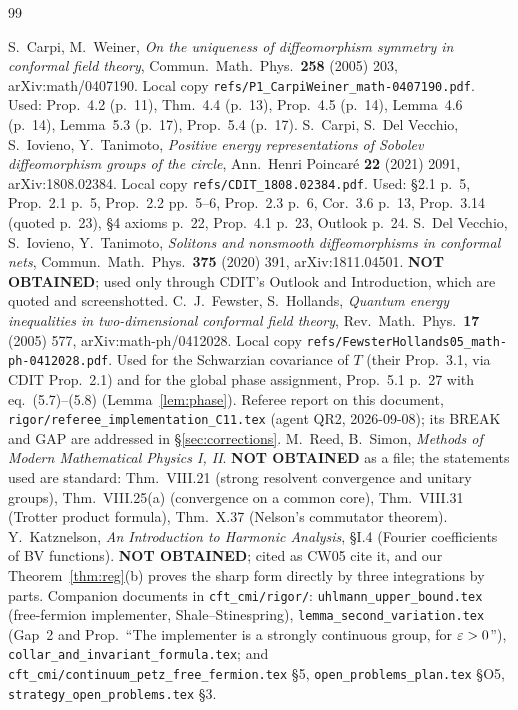 \documentclass[11pt]{article}
\begin{document}
\begin{thebibliography}{99}

 S.~Carpi, M.~Weiner, \emph{On the uniqueness of diffeomorphism symmetry in conformal field theory},
Commun.\ Math.\ Phys.\ \textbf{258} (2005) 203, arXiv:math/0407190.  Local copy
\texttt{refs/P1\_CarpiWeiner\_math-0407190.pdf}.  Used: Prop.~4.2 (p.~11), Thm.~4.4 (p.~13), Prop.~4.5 (p.~14),
Lemma~4.6 (p.~14), Lemma~5.3 (p.~17), Prop.~5.4 (p.~17).
 S.~Carpi, S.~Del Vecchio, S.~Iovieno, Y.~Tanimoto, \emph{Positive energy representations of Sobolev
diffeomorphism groups of the circle}, Ann.\ Henri Poincar\'e \textbf{22} (2021) 2091, arXiv:1808.02384.  Local copy
\texttt{refs/CDIT\_1808.02384.pdf}.  Used: \S2.1 p.~5, Prop.~2.1 p.~5, Prop.~2.2 pp.~5--6, Prop.~2.3 p.~6,
Cor.~3.6 p.~13, Prop.~3.14 (quoted p.~23), \S4 axioms p.~22, Prop.~4.1 p.~23, Outlook p.~24.
 S.~Del Vecchio, S.~Iovieno, Y.~Tanimoto, \emph{Solitons and nonsmooth diffeomorphisms in conformal
nets}, Commun.\ Math.\ Phys.\ \textbf{375} (2020) 391, arXiv:1811.04501.  \textbf{NOT OBTAINED}; used only through
CDIT's Outlook and Introduction, which are quoted and screenshotted.
 C.~J.~Fewster, S.~Hollands, \emph{Quantum energy inequalities in two-dimensional conformal field
theory}, Rev.\ Math.\ Phys.\ \textbf{17} (2005) 577, arXiv:math-ph/0412028.  Local copy
\texttt{refs/FewsterHollands05\_math-ph-0412028.pdf}.  Used for the Schwarzian covariance of $T$ (their Prop.~3.1,
via CDIT Prop.~2.1) and for the global phase assignment, Prop.~5.1 p.~27 with eq.~(5.7)--(5.8) (Lemma~\ref{lem:phase}).
 Referee report on this document, \texttt{rigor/referee\_implementation\_C11.tex} (agent QR2, 2026-09-08);
its BREAK and GAP are addressed in \S\ref{sec:corrections}.
 M.~Reed, B.~Simon, \emph{Methods of Modern Mathematical Physics I, II}.  \textbf{NOT OBTAINED} as a
file; the statements used are standard: Thm.~VIII.21 (strong resolvent convergence and unitary groups),
Thm.~VIII.25(a) (convergence on a common core), Thm.~VIII.31 (Trotter product formula), Thm.~X.37 (Nelson's
commutator theorem).
 Y.~Katznelson, \emph{An Introduction to Harmonic Analysis}, \S I.4 (Fourier coefficients of BV
functions).  \textbf{NOT OBTAINED}; cited as CW05 cite it, and our Theorem~\ref{thm:reg}(b) proves the sharp form
directly by three integrations by parts.
 Companion documents in \texttt{cft\_cmi/rigor/}: \texttt{uhlmann\_upper\_bound.tex} (free-fermion
implementer, Shale--Stinespring), \texttt{lemma\_second\_variation.tex} (Gap~2 and Prop.~``The implementer is a
strongly continuous group, for $\varepsilon>0$''), \texttt{collar\_and\_invariant\_formula.tex}; and
\texttt{cft\_cmi/continuum\_petz\_free\_fermion.tex} \S5, \texttt{open\_problems\_plan.tex} \S O5,
\texttt{strategy\_open\_problems.tex} \S3.
\end{thebibliography}
\end{document}
